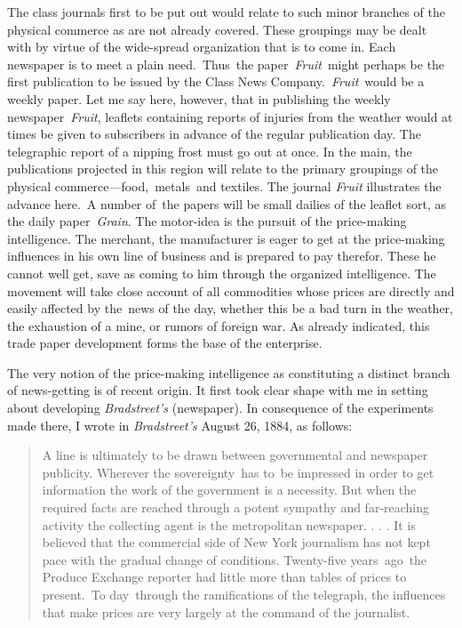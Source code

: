 \documentclass[twoside,symmetric,nobib,justified]{tufte-book}
\begin{document}
The class journals first to be put out would relate to such minor
branches of the physical commerce as are not already covered. These
groupings may be dealt with by virtue of the wide-spread organization
that is to come in. Each newspaper is to meet a plain need.~Thus~the
paper~\emph{Fruit}~might perhaps be the first publication to be issued
by the Class News Company.~\emph{Fruit}~would be a weekly paper. Let me
say here, however, that in publishing the weekly newspaper~\emph{Fruit},
leaflets containing reports of injuries from the weather would at times
be given to subscribers in advance of the regular publication day. The
telegraphic report of a nipping frost must go out at once. In the main,
the publications projected in this region will relate to the primary
groupings of the physical commerce---food,~metals~and textiles. The
journal \emph{Fruit} illustrates the advance here.~A number of~the
papers will be small dailies of the leaflet sort, as the daily
paper~\emph{Grain}. The motor-idea is the pursuit of the price-making
intelligence. The merchant, the manufacturer is eager to get at the
price-making influences in his own line of business and is prepared to
pay therefor. These he cannot well get, save as coming to him through
the organized intelligence. The movement will take close account of all
commodities whose prices are directly and easily affected by the~news of
the day, whether this be a bad turn in the weather, the exhaustion of a
mine, or rumors of foreign war. As already indicated, this trade paper
development forms the base of the enterprise.~

The very notion of the price-making intelligence as constituting a
distinct branch of news-getting is of recent origin. It first took clear
shape with me in setting about developing \emph{Bradstreet's}
(newspaper). In consequence of the experiments made there, I wrote in
\emph{Bradstreet's} August 26, 1884, as follows:

\begin{quote}
A line is ultimately to be drawn between governmental and newspaper
publicity. Wherever the sovereignty~has to~be impressed in order to get
information the work of the government is a necessity. But when the
required facts are reached through a potent sympathy and far-reaching
activity the collecting agent is the metropolitan newspaper. . . . It is
believed that the commercial side of New York journalism has not kept
pace with the gradual change of conditions. Twenty-five years~ago~the
Produce Exchange reporter had little more than tables of prices to
present.~To day~through the ramifications of the telegraph, the
influences that make prices are very largely at the command of the
journalist.~
\end{quote}
\end{document}
